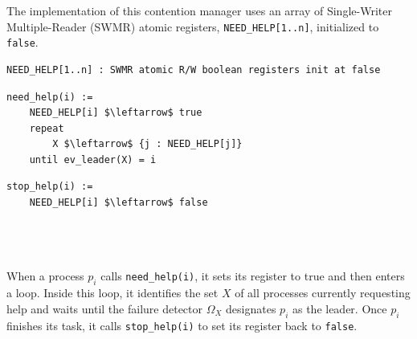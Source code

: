The implementation of this contention manager uses an array of Single-Writer Multiple-Reader (SWMR) atomic registers, \texttt{NEED\_HELP[1..n]}, initialized to \texttt{false}. 

\begin{minipage}{\textwidth}
\begin{lstlisting}[mathescape]
NEED_HELP[1..n] : SWMR atomic R/W boolean registers init at false
\end{lstlisting}
\begin{minipage}{0.45\textwidth}
\begin{lstlisting}[mathescape]
need_help(i) :=
    NEED_HELP[i] $\leftarrow$ true
    repeat
        X $\leftarrow$ {j : NEED_HELP[j]}
    until ev_leader(X) = i
\end{lstlisting}
\end{minipage}
\hfill
\begin{minipage}{0.45\textwidth}
\begin{lstlisting}[mathescape]
stop_help(i) :=
    NEED_HELP[i] $\leftarrow$ false



\end{lstlisting}
\end{minipage}
\end{minipage}\\

When a process $p_i$ calls \texttt{need\_help(i)}, it sets its register to true and then enters a loop. Inside this loop, it identifies the set $X$ of all processes currently requesting help and waits until the failure detector $\Omega_X$ designates $p_i$ as the leader. Once $p_i$ finishes its task, it calls \texttt{stop\_help(i)} to set its register back to \texttt{false}.

